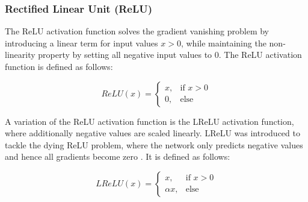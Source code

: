 \subsubsection{Rectified Linear Unit (ReLU)}

The \ac{ReLU} activation function solves the gradient vanishing problem by introducing a linear term for input values $x > 0$, while maintaining the non-linearity property by setting all negative input values to $0$.
The \ac{ReLU} activation function is defined as follows:

\begin{equation}
    ReLU(x) =
    \begin{cases}
        x, & \text{if } x > 0\\
        0, & \text{else}
    \end{cases}
\end{equation}

A variation of the \ac{ReLU} activation function is the \ac{LReLU} activation function, where additionally negative values are scaled linearly.
\ac{LReLU} was introduced to tackle the dying \ac{ReLU} problem, where the network only predicts negative values and hence all gradients become zero \cite{dl}.
It is defined as follows:

\begin{equation}
    LReLU(x) =
    \begin{cases}
        x, & \text{if } x > 0\\
        \alpha x, & \text{else}
    \end{cases}
\end{equation}




